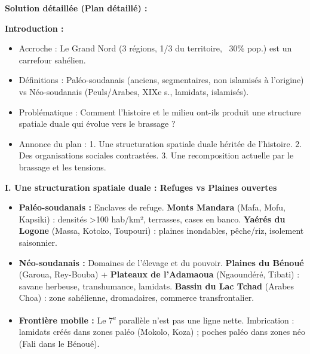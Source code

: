 \documentclass[11pt]{article}
\begin{document}
\begin{exoresolu}
\tcblower
\textbf{Solution détaillée (Plan détaillé) :}

\textbf{Introduction :}
\begin{itemize}
    \item Accroche : Le Grand Nord (3 régions, 1/3 du territoire, ~30\% pop.) est un carrefour sahélien.
    \item Définitions : Paléo-soudanais (anciens, segmentaires, non islamisés à l'origine) vs Néo-soudanais (Peuls/Arabes, XIXe s., lamidats, islamisés).
    \item Problématique : Comment l'histoire et le milieu ont-ils produit une structure spatiale duale qui évolue vers le brassage ?
    \item Annonce du plan : 1. Une structuration spatiale duale héritée de l'histoire. 2. Des organisations sociales contrastées. 3. Une recomposition actuelle par le brassage et les tensions.
\end{itemize}

\textbf{I. Une structuration spatiale duale : Refuges vs Plaines ouvertes}
\begin{itemize}
    \item \textbf{Paléo-soudanais :} Enclaves de refuge. \textbf{Monts Mandara} (Mafa, Mofu, Kapsiki) : densités \textgreater 100 hab/km², terrasses, cases en banco. \textbf{Yaérés du Logone} (Massa, Kotoko, Toupouri) : plaines inondables, pêche/riz, isolement saisonnier.
    \item \textbf{Néo-soudanais :} Domaines de l'élevage et du pouvoir. \textbf{Plaines du Bénoué} (Garoua, Rey-Bouba) + \textbf{Plateaux de l'Adamaoua} (Ngaoundéré, Tibati) : savane herbeuse, transhumance, lamidats. \textbf{Bassin du Lac Tchad} (Arabes Choa) : zone sahélienne, dromadaires, commerce transfrontalier.
    \item \textbf{Frontière mobile :} Le 7\textsuperscript{e} parallèle n'est pas une ligne nette. Imbrication : lamidats créés dans zones paléo (Mokolo, Koza) ; poches paléo dans zones néo (Fali dans le Bénoué).
\end{itemize}


\end{exoresolu}
\end{document}
